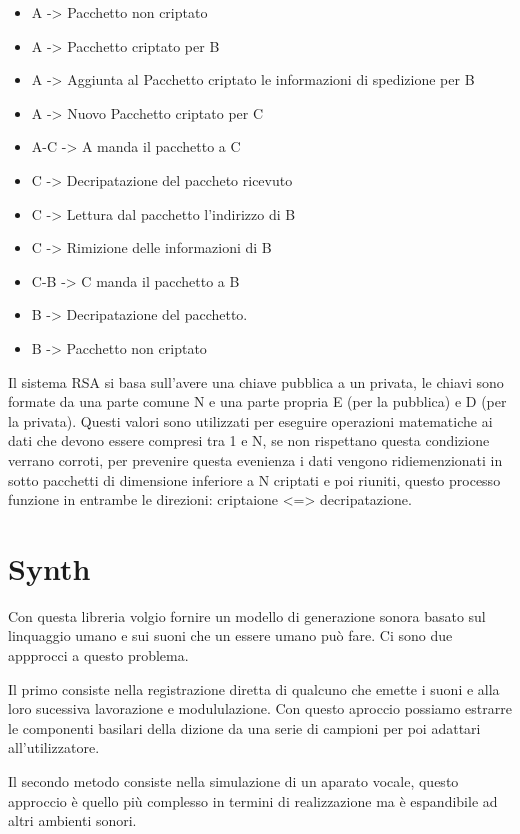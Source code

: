 \documentclass{article}
\begin{document}
\begin{itemize}
    \item A -> Pacchetto non criptato
    \item A -> Pacchetto criptato per B
    \item A -> Aggiunta al Pacchetto criptato le informazioni di spedizione per B
    \item A -> Nuovo Pacchetto criptato per C
    \item A-C -> A manda il pacchetto a C
    \item C -> Decripatazione del paccheto ricevuto
    \item C -> Lettura dal pacchetto l'indirizzo di B
    \item C -> Rimizione delle informazioni di B
    \item C-B -> C manda il pacchetto a B 
    \item B -> Decripatazione del pacchetto.
    \item B -> Pacchetto non criptato
\end{itemize}

Il sistema RSA si basa sull'avere una chiave pubblica a un privata, le chiavi sono formate da una parte comune N e una parte propria E (per la pubblica) e D (per la privata).
Questi valori sono utilizzati per eseguire operazioni matematiche ai dati che devono essere compresi tra 1 e N, se non rispettano questa condizione verrano corroti, per prevenire questa evenienza i dati vengono ridiemenzionati in sotto pacchetti di dimensione inferiore a N criptati e poi riuniti, questo processo funzione in entrambe le direzioni: criptaione <=> decripatazione.

\section {Synth}
Con questa libreria volgio fornire un modello di generazione sonora basato sul linquaggio umano e sui suoni che un essere umano può fare. Ci sono due appprocci a questo problema. 

Il primo consiste nella registrazione diretta di qualcuno che emette i suoni e alla loro sucessiva lavorazione e modululazione. Con questo aproccio possiamo estrarre le componenti basilari della dizione da una serie di campioni per poi adattari all'utilizzatore.

Il secondo metodo consiste nella simulazione di un aparato vocale, questo approccio è quello più complesso in termini di realizzazione ma è espandibile ad altri ambienti sonori.
\end{document}
